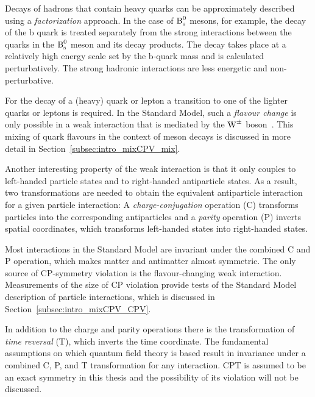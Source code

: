 Decays of hadrons that contain heavy quarks can be approximately described using a \emph{factorization} approach. In the case of $\Bs$
mesons, for example, the decay of the b quark is treated separately from the strong interactions between the quarks in the $\Bs$ meson and
its decay products. The decay takes place at a relatively high energy scale set by the b-quark mass and is calculated perturbatively. The
strong hadronic interactions are less energetic and non-perturbative.

For the decay of a (heavy) quark or lepton a transition to one of the lighter quarks or leptons is required. In the Standard Model, such a
\emph{flavour change} is only possible in a weak interaction that is mediated by the $\Wpm$
boson~\cite{Cabibbo:1963yz,Glashow:1970gm,Kobayashi:1973fv,Pontecorvo:1957cp,*Pontecorvo:1957qd,*Maki:1962mu,*Pontecorvo:1967fh}. This
mixing of quark flavours in the context of meson decays is discussed in more detail in Section~\ref{subsec:intro_mixCPV_mix}.


Another interesting property of the weak interaction is that it only couples to left-handed particle states and to right-handed
antiparticle states. As a result, two transformations are needed to obtain the equivalent antiparticle interaction for a given particle
interaction: A \emph{charge-conjugation} operation (C) transforms particles into the corresponding antiparticles and a \emph{parity}
operation (P) inverts spatial coordinates, which transforms left-handed states into right-handed states.

Most interactions in the Standard Model are invariant under the combined C and P operation, which makes matter and antimatter almost
symmetric. The only source of CP-symmetry violation is the flavour-changing weak interaction. Measurements of the size of CP violation
provide tests of the Standard Model description of particle interactions, which is discussed in Section~\ref{subsec:intro_mixCPV_CPV}.

In addition to the charge and parity operations there is the transformation of \emph{time reversal} (T), which inverts the time coordinate.
The fundamental assumptions on which quantum field theory is based result in invariance under a combined C, P, and T transformation for any
interaction. CPT is assumed to be an exact symmetry in this thesis and the possibility of its violation will not be discussed.


